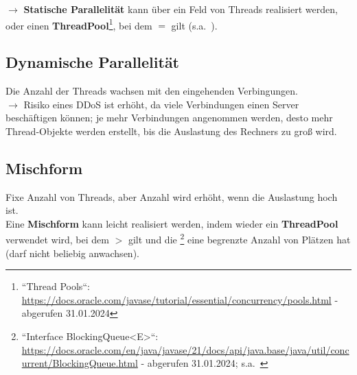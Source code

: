$\rightarrow$ \textbf{Statische Parallelität} kann über ein Feld von Threads realisiert werden, oder einen \textbf{ThreadPool}\footnote{
``Thread Pools``: \url{https://docs.oracle.com/javase/tutorial/essential/concurrency/pools.html} - abgerufen 31.01.2024
}, bei dem  $=$  gilt (s.a.~\cite[146]{Oec22}).


\subsection*{Dynamische Parallelität}
Die Anzahl der Threads wachsen mit den eingehenden Verbingungen.\\

$\rightarrow$ Risiko eines DDoS ist erhöht, da viele Verbindungen einen Server beschäftigen können; je mehr Verbindungen angenommen werden, desto mehr Thread-Objekte werden erstellt, bis die Auslastung des Rechners zu groß wird.

\subsection*{Mischform}
Fixe Anzahl von Threads, aber Anzahl wird erhöht, wenn die Auslastung hoch ist.\\

\noindent
Eine \textbf{Mischform} kann leicht realisiert werden, indem wieder ein \textbf{ThreadPool} verwendet wird, bei dem  $>$  gilt und die \footnote{ ``Interface BlockingQueue<E>``: \url{https://docs.oracle.com/en/java/javase/21/docs/api/java.base/java/util/concurrent/BlockingQueue.html} - abgerufen 31.01.2024; s.a.~\cite[146]{Oec22}} eine begrenzte Anzahl von Plätzen hat (darf nicht beliebig anwachsen).